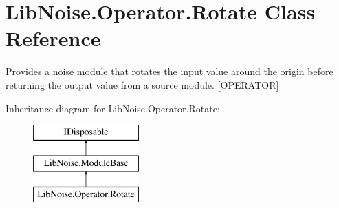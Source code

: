 \hypertarget{class_lib_noise_1_1_operator_1_1_rotate}{}\section{Lib\+Noise.\+Operator.\+Rotate Class Reference}
\label{class_lib_noise_1_1_operator_1_1_rotate}


Provides a noise module that rotates the input value around the origin before returning the output value from a source module. \mbox{[}O\+P\+E\+R\+A\+T\+OR\mbox{]}  


Inheritance diagram for Lib\+Noise.\+Operator.\+Rotate\+:\begin{figure}[H]
\begin{center}
\leavevmode
\includegraphics[height=3.000000cm]{class_lib_noise_1_1_operator_1_1_rotate}
\end{center}
\end{figure}
